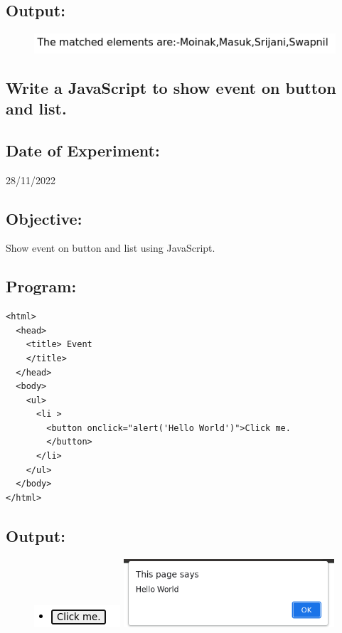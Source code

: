 \documentclass[12pt, a4paper]{article}
\begin{document}
\subsection*{Output:}
\vskip10pt
\setcounter{figure}{0}
\begin{figure}[h]
  \centering
  \includegraphics{13}
\end{figure}

\pagebreak

\begin{tcolorbox}
  \section{Write a JavaScript to show event on button and list.}
\end{tcolorbox}
\subsection*{Date of Experiment:}
28/11/2022
\subsection*{Objective:}
Show event on button and list using JavaScript.

\subsection*{Program:}
\begin{lstlisting}
<html>
  <head>
    <title> Event 
    </title>
  </head>
  <body>
    <ul>
      <li > 
        <button onclick="alert('Hello World')">Click me.
        </button> 
      </li>
    </ul>
  </body>
</html>
\end{lstlisting}
\subsection*{Output:}
\setcounter{figure}{0}
\begin{figure}[h]
  \centering
  \includegraphics{14}\vskip10pt

  \includegraphics[width=0.7\textwidth]{15}
\end{figure}
\end{document}

